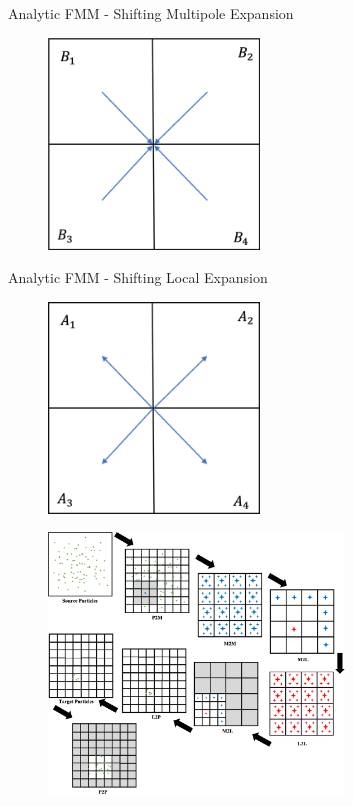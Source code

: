 \begin{frame}{Analytic FMM - Shifting Multipole Expansion}
    \begin{figure}
        \includegraphics[width=0.5\textwidth]{assets/multipole_shift.png}
        \vspace{50pt}
    \end{figure}
\end{frame}

\begin{frame}{Analytic FMM - Shifting Local Expansion}
    \begin{figure}
        \includegraphics[width=0.5\textwidth]{assets/local_shift.png}
        \vspace{50pt}
    \end{figure}
\end{frame}

\begin{frame}
    \begin{figure}
        \centering
        \includegraphics[width=0.7\textwidth]{assets/main_loop.png}
    \end{figure}
    \vspace{50pt}
\end{frame}

